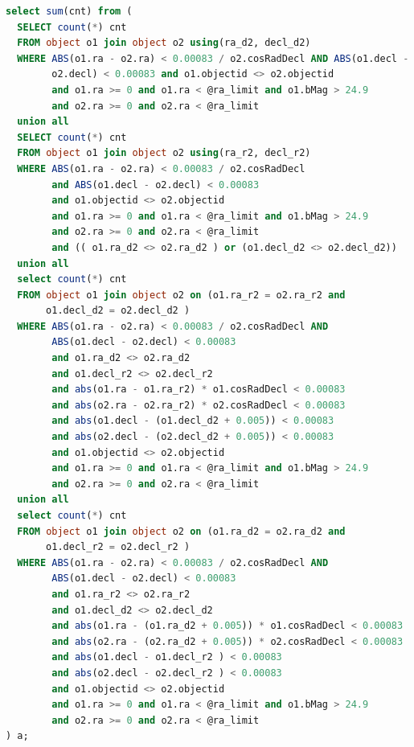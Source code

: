 \documentclass[DM,lsstdraft,toc]{lsstdoc}
\begin{document}
\begin{lstlisting}[language=SQL]
select sum(cnt) from (
  SELECT count(*) cnt
  FROM object o1 join object o2 using(ra_d2, decl_d2)
  WHERE ABS(o1.ra - o2.ra) < 0.00083 / o2.cosRadDecl AND ABS(o1.decl -
        o2.decl) < 0.00083 and o1.objectid <> o2.objectid
        and o1.ra >= 0 and o1.ra < @ra_limit and o1.bMag > 24.9
        and o2.ra >= 0 and o2.ra < @ra_limit
  union all
  SELECT count(*) cnt
  FROM object o1 join object o2 using(ra_r2, decl_r2)
  WHERE ABS(o1.ra - o2.ra) < 0.00083 / o2.cosRadDecl
        and ABS(o1.decl - o2.decl) < 0.00083
        and o1.objectid <> o2.objectid
        and o1.ra >= 0 and o1.ra < @ra_limit and o1.bMag > 24.9
        and o2.ra >= 0 and o2.ra < @ra_limit
        and (( o1.ra_d2 <> o2.ra_d2 ) or (o1.decl_d2 <> o2.decl_d2))
  union all
  select count(*) cnt
  FROM object o1 join object o2 on (o1.ra_r2 = o2.ra_r2 and
       o1.decl_d2 = o2.decl_d2 )
  WHERE ABS(o1.ra - o2.ra) < 0.00083 / o2.cosRadDecl AND
        ABS(o1.decl - o2.decl) < 0.00083
        and o1.ra_d2 <> o2.ra_d2
        and o1.decl_r2 <> o2.decl_r2
        and abs(o1.ra - o1.ra_r2) * o1.cosRadDecl < 0.00083
        and abs(o2.ra - o2.ra_r2) * o2.cosRadDecl < 0.00083
        and abs(o1.decl - (o1.decl_d2 + 0.005)) < 0.00083
        and abs(o2.decl - (o2.decl_d2 + 0.005)) < 0.00083
        and o1.objectid <> o2.objectid
        and o1.ra >= 0 and o1.ra < @ra_limit and o1.bMag > 24.9
        and o2.ra >= 0 and o2.ra < @ra_limit
  union all
  select count(*) cnt
  FROM object o1 join object o2 on (o1.ra_d2 = o2.ra_d2 and
       o1.decl_r2 = o2.decl_r2 )
  WHERE ABS(o1.ra - o2.ra) < 0.00083 / o2.cosRadDecl AND
        ABS(o1.decl - o2.decl) < 0.00083
        and o1.ra_r2 <> o2.ra_r2
        and o1.decl_d2 <> o2.decl_d2
        and abs(o1.ra - (o1.ra_d2 + 0.005)) * o1.cosRadDecl < 0.00083
        and abs(o2.ra - (o2.ra_d2 + 0.005)) * o2.cosRadDecl < 0.00083
        and abs(o1.decl - o1.decl_r2 ) < 0.00083
        and abs(o2.decl - o2.decl_r2 ) < 0.00083
        and o1.objectid <> o2.objectid
        and o1.ra >= 0 and o1.ra < @ra_limit and o1.bMag > 24.9
        and o2.ra >= 0 and o2.ra < @ra_limit
) a;
\end{lstlisting}
\end{document}
